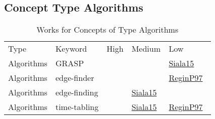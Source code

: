 \clearpage
\subsection{Concept Type Algorithms}
\label{sec:Algorithms}
{\scriptsize
\begin{longtable}{lp{3cm}>{\raggedright\arraybackslash}p{6cm}>{\raggedright\arraybackslash}p{6cm}>{\raggedright\arraybackslash}p{8cm}}
\rowcolor{white}\caption{Works for Concepts of Type Algorithms}\\ \toprule
\rowcolor{white}Type & Keyword & High & Medium & Low\\ \midrule\endhead
\bottomrule
\endfoot
Algorithms & GRASP &  &  & \href{../cars/works/Siala15.pdf}{Siala15}~\cite{Siala15}\\
Algorithms & edge-finder &  &  & \href{../cars/works/ReginP97.pdf}{ReginP97}~\cite{ReginP97}\\
Algorithms & edge-finding &  & \href{../cars/works/Siala15.pdf}{Siala15}~\cite{Siala15} & \\
Algorithms & time-tabling &  & \href{../cars/works/Siala15.pdf}{Siala15}~\cite{Siala15} & \href{../cars/works/ReginP97.pdf}{ReginP97}~\cite{ReginP97}\\
\end{longtable}
}


